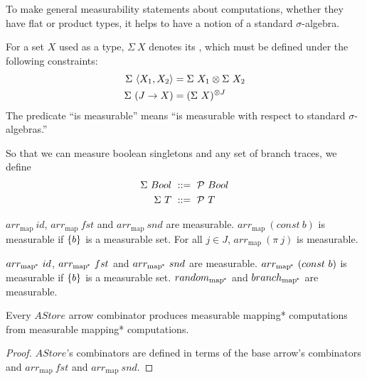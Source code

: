 \documentclass[preprint]{sigplanconf}
\newcommand{\arrowarr}{\ensuremath{arr}}
\newcommand{\map}{_\mathrm{map}}
\newcommand{\arrmap}{\arrowarr\map}
\newcommand{\pmap}{_\mathrm{map^{\mspace{-2mu}*}}}
\newcommand{\arrpmap}{\arrowarr\pmap}
\begin{document}
To make general measurability statements about computations, whether they have flat or product types, it helps to have a notion of a standard $\sigma$-algebra.

\begin{definition}
For a set $X$ used as a type, $\Sigma~X$ denotes its , which must be defined under the following constraints:
\begin{align}
	\Sigma~\langle{X_1,X_2}\rangle & = \Sigma~X_1 \otimes \Sigma~X_2
	\label{eqn:standard-finite-product-rule}
\\
	\Sigma~(J \to X) & = (\Sigma~X)^{\otimes J}
	\label{eqn:standard-arbitrary-product-rule}
\end{align}
The predicate ``is measurable'' means ``is measurable with respect to standard $\sigma$-algebras.''
\label{def:standard-sigma-algebra}
\end{definition}

So that we can measure boolean singletons and any set of branch traces, we define
\begin{align}
	\Sigma~Bool &\ ::=\ \mathcal{P}~Bool
	\label{eqn:standard-boolean-rule}
\\
	\Sigma~T &\ ::=\ \mathcal{P}~T
	\label{eqn:standard-traces-rule}
\end{align}

\begin{lemma}
$\arrmap~id$, $\arrmap~fst$ and $\arrmap~snd$ are measurable.
$\arrmap~(const~b)$ is measurable if $\{{b}\}$ is a measurable set.
For all $j \in J$, $\arrmap~(\pi~j)$ is measurable.
\end{lemma}


\begin{corollary}
$\arrpmap~id$, $\arrpmap~fst$ and $\arrpmap~snd$ are measurable.
$\arrpmap~(const~b)$ is measurable if $\{{b}\}$ is a measurable set.
$random\pmap$ and $branch\pmap$ are measurable.
\end{corollary}

\begin{theorem}
Every $AStore$ arrow combinator produces measurable mapping* computations from measurable mapping* computations.
\label{thm:astore-measurability-transfer}
\end{theorem}
\begin{proof}
$AStore$'s combinators are defined in terms of the base arrow's combinators and $\arrmap~fst$ and $\arrmap~snd$.
\end{proof}
\end{document}
